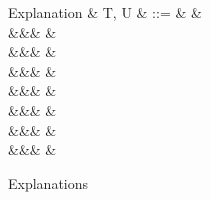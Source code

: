 \begin{figure}[H]
\begin{syntaxfig}
\mbox{Explanation}
&
T, U
&
::=
&
&
\\
&&&
\trUnit{\rho}
&
\\
&&&
&
\\
&&&
&
\\
&&&
&
\\
&&&
\trFun{\sigma}
&
\\
&&&
&
\\
&&&
&
\end{syntaxfig}
\caption{Explanations}
\end{figure}
